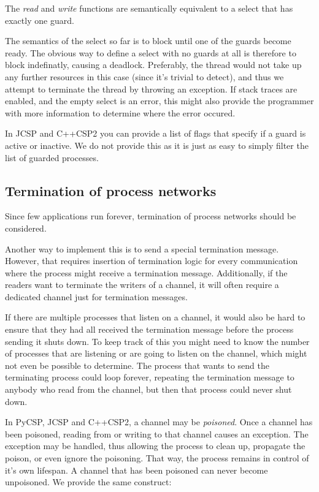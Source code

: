 \documentclass[a4paper,12pt]{article}
\begin{document}
The \emph{read} and \emph{write} functions are semantically equivalent to a select that has exactly 
one guard.

The semantics of the select so far is to block until one of the guards become ready. The obvious
way to define a select with no guards at all is therefore to block indefinatly, causing a deadlock.
Preferably, the thread would not take up any further resources in this case (since it's trivial to 
detect), and thus we attempt to terminate the thread by throwing an exception. If stack traces are
enabled, and the empty select is an error, this might also provide the programmer with more information
to determine where the error occured.

In JCSP and C++CSP2 you can provide a list of flags that specify if a guard is
active or inactive. We do not provide this as it is just as easy to simply
filter the list of guarded processes.

\subsection{Termination of process networks}
Since few applications run forever, termination of process networks should be
considered.

Another way to implement this is to send a special termination message. However,
that requires insertion of termination logic for every communication where the
process might receive a termination message. Additionally, if the readers want
to terminate the writers of a channel, it will often require a dedicated channel
just for termination messages.

If there are multiple processes that listen on a channel, it would also be hard
to ensure that they had all received the termination message before the process
sending it shuts down. To keep track of this you might need to know the number
of processes that are listening or are going to listen on the channel, which
might not even be possible to determine. The process that wants to send the
terminating process could loop forever, repeating the termination message to
anybody who read from the channel, but then that process could never shut down.

In PyCSP, JCSP and C++CSP2, a channel may be \emph{poisoned}. Once a channel
has been poisoned, reading from or writing to that channel causes an exception.
The exception may be handled, thus allowing the process to clean up, propagate
the poison, or even ignore the poisoning. That way, the process remains in
control of it's own lifespan. A channel that has been poisoned can never become
unpoisoned. We provide the same construct:
\end{document}
